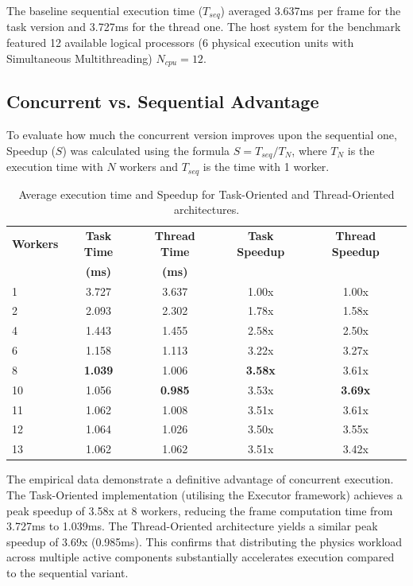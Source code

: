 \documentclass{scrartcl}
\begin{document}
The baseline sequential execution time ($T_{seq}$) averaged 3.637ms per frame for the task version and 3.727ms for the thread one. The host system for the benchmark featured 12 available logical processors (6 physical execution units with Simultaneous
Multithreading) $N_{cpu} = 12$.

\subsection{Concurrent vs. Sequential Advantage}
To evaluate how much the concurrent version improves upon the sequential one, Speedup ($S$) was calculated using the formula $S = T_{seq} / T_N$, where $T_N$ is the execution time with $N$ workers and $T_{seq}$ is the time with 1 worker.

\begin{table}[H]
    \centering
    \begin{tabular}{@{}lcccc@{}}
        \toprule
        \textbf{Workers} & \textbf{Task Time} & \textbf{Thread Time} & \textbf{Task Speedup} & \textbf{Thread Speedup} \\
        & \textbf{(ms)} & \textbf{(ms)} \\ \midrule
        1 & 3.727 & 3.637 & 1.00x & 1.00x \\
        2 & 2.093 & 2.302 & 1.78x & 1.58x \\
        4 & 1.443 & 1.455 & 2.58x & 2.50x \\
        6 & 1.158 & 1.113 & 3.22x & 3.27x \\
        8 & \textbf{1.039} & 1.006 & \textbf{3.58x} & 3.61x \\
        10 & 1.056 & \textbf{0.985} & 3.53x & \textbf{3.69x} \\
        11 & 1.062 & 1.008 & 3.51x & 3.61x \\
        12 & 1.064 & 1.026 & 3.50x & 3.55x \\
        13 & 1.062 & 1.062 & 3.51x & 3.42x \\ \bottomrule
    \end{tabular}
    \caption{Average execution time and Speedup for Task-Oriented and Thread-Oriented architectures.}
    \label{tab:speedup}
\end{table}

The empirical data demonstrate a definitive advantage of concurrent execution. The Task-Oriented implementation (utilising the Executor framework) achieves a peak speedup of 3.58x at 8 workers, reducing the frame computation time from 3.727ms to 1.039ms. The Thread-Oriented architecture yields a similar peak speedup of 3.69x (0.985ms). This confirms that distributing the physics workload across multiple active components substantially accelerates execution compared to the sequential variant.
\end{document}
